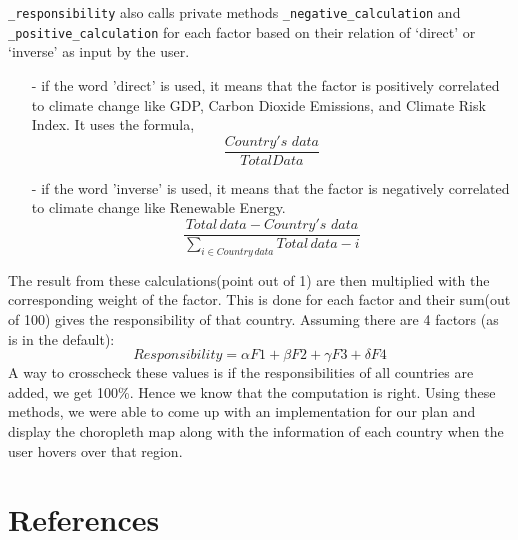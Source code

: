 \documentclass[fontsize=11pt]{article}
\begin{document}
    \texttt{\_responsibility} also calls private methods \texttt{\_negative\_calculation} and \texttt{\_positive\_calculation} for each factor based on
    their relation of ‘direct’ or ‘inverse’ as input by the user.\newline
    \begin{enumerate}
        \item [-] if the word 'direct' is used, it means that the factor is positively correlated to climate change like
        GDP, Carbon Dioxide Emissions, and Climate Risk Index. It uses the formula,
        \[
            \frac{Country's \, \, data}{Total Data}
        \]

        \item [-] if the word 'inverse' is used, it means that the factor is negatively correlated to climate change like
        Renewable Energy.
        \[
            \frac{Total \, data - Country's \, \, data}{\displaystyle\sum_{i \in Country \, data} Total \, data - i }
        \]
    \end{enumerate}
    The result from these calculations(point out of 1) are then multiplied with the corresponding weight of the factor.
    This is done for each factor and their sum(out of 100) gives the responsibility of that country. Assuming there are 4 factors (as is in the default):
    \[
        Responsibility = \alpha F1 + \beta F2 + \gamma F3 + \delta F4
    \]
    A way to crosscheck these values
    is if the responsibilities of all countries are added, we get 100\%. Hence we know that the computation is right.
    \newline
    Using these methods, we were able to come up with an implementation for our plan and display the
    choropleth map along with the information of each country when the user hovers over that region.\newline



    \section*{References}
\end{document}
